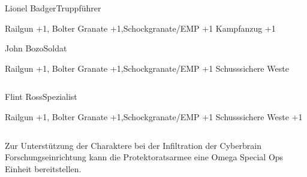 \begin{column}[l]{0.45}
    \begin{nscsheet}[h]{Lionel Badger\newline{}Truppführer}
        \nscstats[ATT=2,AGG=2]
        \nscruler
        \begin{nscinventory}
            \nscitem[Waffen] Railgun +1, Bolter
            \nscitem[Granaten] Granate +1,\newline{}Schockgranate/EMP +1
            \nscitem[Rüstung] Kampfanzug +1
        \end{nscinventory}
    \end{nscsheet}

    \begin{nscsheet}[h]{John Bozo\newline{}Soldat}
        \nscstats[ATT=2,AGG=2]
        \nscruler
        \begin{nscinventory}
            \nscitem[Waffen] Railgun +1, Bolter
            \nscitem[Granaten] Granate +1,\newline{}Schockgranate/EMP +1
            \nscitem[Rüstung] Schusssichere Weste
        \end{nscinventory}
    \end{nscsheet}
\end{column}
\begin{column}[r]{0.45}
    \begin{nscsheet}[h]{Flint Ross\newline{}Spezialist}
        \nscstats[ATT=2,AGG=1,DEX=3]
        \nscruler
        \begin{nscinventory}
            \nscitem[Waffen] Railgun +1, Bolter
            \nscitem[Granaten] Granate +1,\newline{}Schockgranate/EMP +1
            \nscitem[Rüstung] Schusssichere Weste +1
        \end{nscinventory}
    \end{nscsheet}
\end{column}
\vfill

\pagebreak
{}

Zur Unterstützung der Charaktere bei der Infiltration der Cyberbrain Forschungseinrichtung kann die Protektoratsarmee eine 
Omega Special Ops Einheit bereitstellen.

